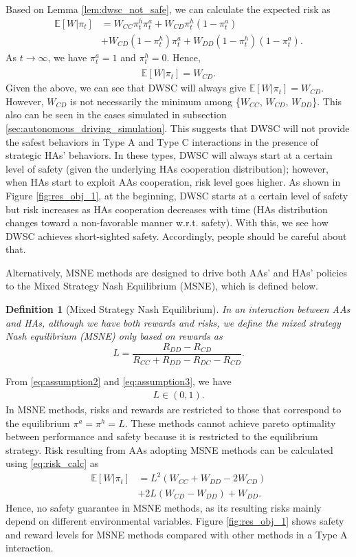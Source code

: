 \documentclass[letterpaper]{article} %
\newtheorem{definition}{Definition}
\begin{document}
Based on Lemma \ref{lem:dwsc_not_safe}, we can calculate the expected risk as
\begin{align}
    \label{eq:risk_calc}
    \mathbb{E}[W|\pi_t]&=W_{CC}\pi^h_t\pi^a_t+W_{CD}\pi^h_t(1-\pi^a_t)\\ &+W_{CD}(1-\pi^h_t)\pi^a_t+W_{DD}(1-\pi^h_t)(1-\pi^a_t). \nonumber
\end{align}
As $t \xrightarrow[]{} \infty$,  we have $\pi^a_t = 1$ and $\pi^h_t = 0$. Hence,
\begin{align}
    \mathbb{E}[W|\pi_t]= W_{CD}.
\end{align}
Given the above, we can see that DWSC will always give $\mathbb{E}[W|\pi_t]= W_{CD}$. However, $W_{CD}$ is not necessarily the minimum among \{$W_{CC}$, $W_{CD}$, $W_{DD}$\}. This also can be seen in the cases simulated in subsection \ref{sec:autonomous_driving_simulation}. This suggests that DWSC will not provide the safest behaviors in Type A and Type C interactions in the presence of strategic HAs' behaviors. In these types, DWSC will always start at a certain level of safety (given the underlying HAs cooperation distribution); however, when HAs start to exploit AAs cooperation, risk level goes higher. As shown in Figure \ref{fig:res_obj_1}, at the beginning, DWSC starts at a certain level of safety but risk increases as HAs cooperation decreases with time (HAs distribution changes toward a non-favorable manner w.r.t. safety). With this, we see how DWSC achieves short-sighted safety. Accordingly, people should be careful about that.


Alternatively, MSNE methods are designed to drive both AAs' and HAs' policies to the Mixed Strategy Nash Equilibrium (MSNE), which is defined below.
\begin{definition}[Mixed Strategy Nash Equilibrium]
In an interaction between AAs and HAs, although we have both rewards and risks, we define the mixed strategy Nash equilibrium (MSNE) only based on rewards as
\begin{equation} \label{eq:msne}
L = \frac{R_{DD}-R_{CD}}{R_{CC}+R_{DD}-R_{DC}-R_{CD}}.
\end{equation}
\end{definition}
From \eqref{eq:assumption2} and \eqref{eq:assumption3}, we have
\begin{align}
\label{eq:assumption1}
    L\in(0,1).
\end{align}
In MSNE methods, risks and rewards are restricted to those that correspond to the equilibrium $\pi^a = \pi^h  = L$. These methods cannot achieve pareto optimality between performance and safety because it is restricted to the equilibrium strategy.
Risk resulting from AAs adopting MSNE methods can be calculated using \eqref{eq:risk_calc} as
\begin{align}
    \mathbb{E}[W|\pi_t]&= L^2 (W_{CC} + W_{DD} - 2 W_{CD}) \\
    &+ 2L (W_{CD} - W_{DD}) + W_{DD}. \nonumber
\end{align}
Hence, no safety guarantee in MSNE methods, as its resulting risks mainly depend on different environmental variables. Figure \ref{fig:res_obj_1} shows safety and reward levels for MSNE methods compared with other methods in a Type A interaction.
\end{document}
